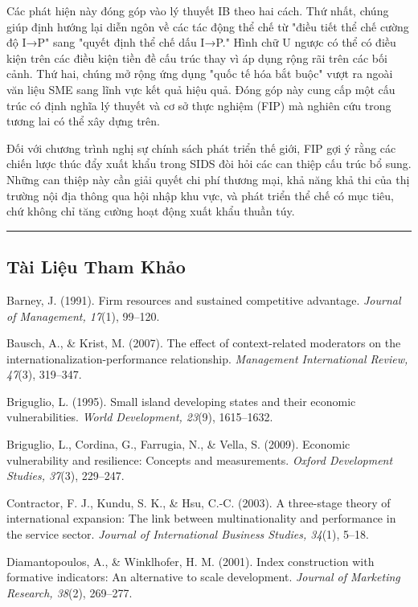 \documentclass[12pt,a4paper]{article}
\begin{document}
Các phát hiện này đóng góp vào lý thuyết IB theo hai cách. Thứ nhất,
chúng giúp định hướng lại diễn ngôn về các tác động thể chế từ "điều
tiết thể chế cường độ I→P" sang "quyết định thể chế dấu I→P." Hình chữ U
ngược có thể có điều kiện trên các điều kiện tiền đề cấu trúc thay vì áp
dụng rộng rãi trên các bối cảnh. Thứ hai, chúng mở rộng ứng dụng "quốc
tế hóa bắt buộc" vượt ra ngoài văn liệu SME sang lĩnh vực kết quả hiệu
quả. Đóng góp này cung cấp một cấu trúc có định nghĩa lý thuyết và cơ sở
thực nghiệm (FIP) mà nghiên cứu trong tương lai có thể xây dựng trên.

Đối với chương trình nghị sự chính sách phát triển thế giới, FIP gợi ý
rằng các chiến lược thúc đẩy xuất khẩu trong SIDS đòi hỏi các can thiệp
cấu trúc bổ sung. Những can thiệp này cần giải quyết chi phí thương mại,
khả năng khả thi của thị trường nội địa thông qua hội nhập khu vực, và
phát triển thể chế có mục tiêu, chứ không chỉ tăng cường hoạt động xuất
khẩu thuần túy.

\begin{center}\rule{0.5\linewidth}{0.5pt}\end{center}

\hypertarget{tuxe0i-liux1ec7u-tham-khux1ea3o}{%
\subsection{Tài Liệu Tham Khảo}\label{tuxe0i-liux1ec7u-tham-khux1ea3o}}

Barney, J. (1991). Firm resources and sustained competitive advantage.
\emph{Journal of Management, 17}(1), 99--120.

Bausch, A., \& Krist, M. (2007). The effect of context-related
moderators on the internationalization-performance relationship.
\emph{Management International Review, 47}(3), 319--347.

Briguglio, L. (1995). Small island developing states and their economic
vulnerabilities. \emph{World Development, 23}(9), 1615--1632.

Briguglio, L., Cordina, G., Farrugia, N., \& Vella, S. (2009). Economic
vulnerability and resilience: Concepts and measurements. \emph{Oxford
Development Studies, 37}(3), 229--247.

Contractor, F. J., Kundu, S. K., \& Hsu, C.-C. (2003). A three-stage
theory of international expansion: The link between multinationality and
performance in the service sector. \emph{Journal of International
Business Studies, 34}(1), 5--18.

Diamantopoulos, A., \& Winklhofer, H. M. (2001). Index construction with
formative indicators: An alternative to scale development. \emph{Journal
of Marketing Research, 38}(2), 269--277.
\end{document}

